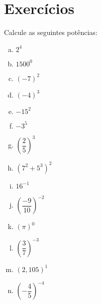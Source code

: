\section{Exercícios}


\begin{exer}
Calcule as seguintes potências:
\begin{multicols}{2}
\begin{enumerate}[a)]
\item $2^4$
\item $1500^0$
\item $(-7)^2$
\item $(-4)^3$
\item $-15^2$
\item $-3^5$
\item $\left(\dfrac{2}{5}\right)^3$
\item $(7^2 + 5^3)^2$
\item $16^{-1}$
\item $\left(\dfrac{-9}{10}\right)^{-2}$
\item $(\pi)^0$
\item $\left(\dfrac{3}{7}\right)^{-3}$
\item $(2,105)^1$
\item $\left( - \dfrac{4}{5} \right)^{-4}$
\end{enumerate}
\end{multicols}
\end{exer}
\begin{resp}
  \construirResp
\end{resp}

